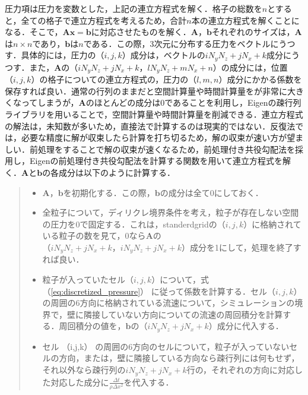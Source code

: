 \documentclass[a4j,12pt]{jreport}
\begin{document}
圧力項は圧力を変数とした，上記の連立方程式を解く．格子の総数を$n$とすると，全ての格子で連立方程式を考えるため，合計$n$本の連立方程式を解くことになる．そこで，$\bm{Ax=b}$に対応させたものを解く．$\bm{A}$，$\bm{b}$それぞれのサイズは，$\bm{A}$は$n \times n$であり，$\bm{b}$は$n$である．この際，3次元に分布する圧力をベクトルにうつす．具体的には，圧力の$ （i,j,k） $成分は，ベクトルの$iN_yN_z+jN_x+k$成分にうつす．また，$\bm{A}$の$ （iN_yN_z+jN_x+k，lN_yN_z+mN_x+n） $の成分には，位置$ （i,j,k） $の格子についての連立方程式の，圧力の$ （l,m,n） $成分にかかる係数を保存すれば良い．通常の行列のままだと空間計算量や時間計算量をが非常に大きくなってしまうが，$\bm{A}$のほとんどの成分は$0$であることを利用し，Eigenの疎行列ライブラリを用いることで，空間計算量や時間計算量を削減できる．連立方程式の解法は，未知数が多いため，直接法で計算するのは現実的ではない．反復法では，必要な精度に解が収束したら計算を打ち切るため，解の収束が速い方が望ましい．前処理をすることで解の収束が速くなるため，前処理付き共役勾配法を採用し，Eigenの前処理付き共役勾配法を計算する関数を用いて連立方程式を解く．$\bm{A}$と$\bm{b}$の各成分は以下のように計算する．
\begin{quote}
	\begin{itemize}
		\item $\bm{A}$，$\bm{b}$を初期化する．この際，$\bm{b}$の成分は全て0にしておく．
		\item 全粒子について，ディリクレ境界条件を考え，粒子が存在しない空間の圧力を$0$で固定する．これは，standerdgridの$ （i,j,k） $に格納されている粒子の数を見て，0なら$\bm{A}$の$ （iN_yN_z+jN_x+k，iN_yN_z+jN_x+k） $成分を1にして，処理を終了すれば良い．
		\item 粒子が入っていたセル$ （i,j,k） $について，式 （\ref{eq:discretized_pressure}） に従って係数を計算する．セル$ （i,j,k） $の周囲の6方向に格納されている流速について，シミュレーションの境界で，壁に隣接していない方向についての流速の周回積分を計算する．周回積分の値を，$\bm{b}$の$ （iN_yN_z+jN_x+k） $成分に代入する．
		\item セル （i,j,k） の周囲の6方向のセルについて，粒子が入っていないセルの方向，または，壁に隣接している方向なら疎行列には何もせず，それ以外なら疎行列の$iN_yN_z+jN_x+k$行の，それぞれの方向に対応した対応した成分に$\frac{\varDelta t}{\rho\varDelta x^2}$を代入する．
	\end{itemize}
\end{quote}
\end{document}
